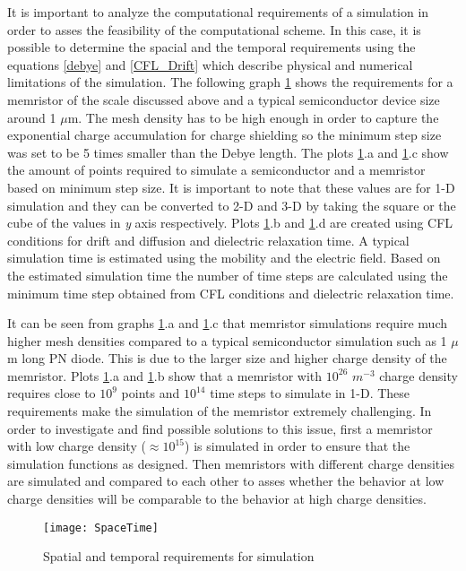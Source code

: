 \begin{doublespace}
It is important to analyze the computational requirements of a simulation in order to asses the feasibility of the computational scheme. In this case, it is possible to determine the spacial and the temporal requirements using the equations \ref{debye} and \ref{CFL_Drift} which describe physical and numerical limitations of the simulation. The following graph \ref{SpaceTime} shows the requirements for a memristor of the scale discussed above and a typical semiconductor device size around 1 $\mu$m. The mesh density has to be high enough in order to capture the exponential charge accumulation for charge shielding so the minimum step size was set to be 5 times smaller than the Debye length. The plots \ref{SpaceTime}.a and \ref{SpaceTime}.c show the amount of points required to simulate a semiconductor and a memristor based on minimum step size. It is important to note that these values are for 1-D simulation and they can be converted to 2-D and 3-D by taking the square or the cube of the values in \textit{y} axis respectively. Plots \ref{SpaceTime}.b and \ref{SpaceTime}.d are created using CFL conditions for drift and diffusion and dielectric relaxation time. A typical simulation time is estimated using the mobility and the electric field. Based on the estimated simulation time the number of time steps are calculated using the minimum time step obtained from CFL conditions and dielectric relaxation time.

It can be seen from graphs \ref{SpaceTime}.a and \ref{SpaceTime}.c that memristor simulations require much higher mesh densities compared to a typical semiconductor simulation such as 1 $\mu$m long PN diode. This is due to the larger size and higher charge density of the memristor. Plots \ref{SpaceTime}.a and \ref{SpaceTime}.b show that a memristor with $10^{26}$ $m^{-3}$ charge density requires close to $10^9$ points and $10^{14}$ time steps to simulate in 1-D. These requirements make the simulation of the memristor extremely challenging. In order to investigate and find possible solutions to this issue, first a memristor with low charge density ($\approx 10^{15}$) is simulated in order to ensure that the simulation functions as designed. Then memristors with different charge densities are simulated and compared to each other to asses whether the behavior at low charge densities will be comparable to the behavior at high charge densities.

\begin{landscape}
\begin{figure}[htp]
\centering
\texttt{[image: SpaceTime]}
\caption{Spatial and temporal requirements for simulation} 
\label{SpaceTime}
\end{figure}
\end{landscape}



\end{doublespace}
